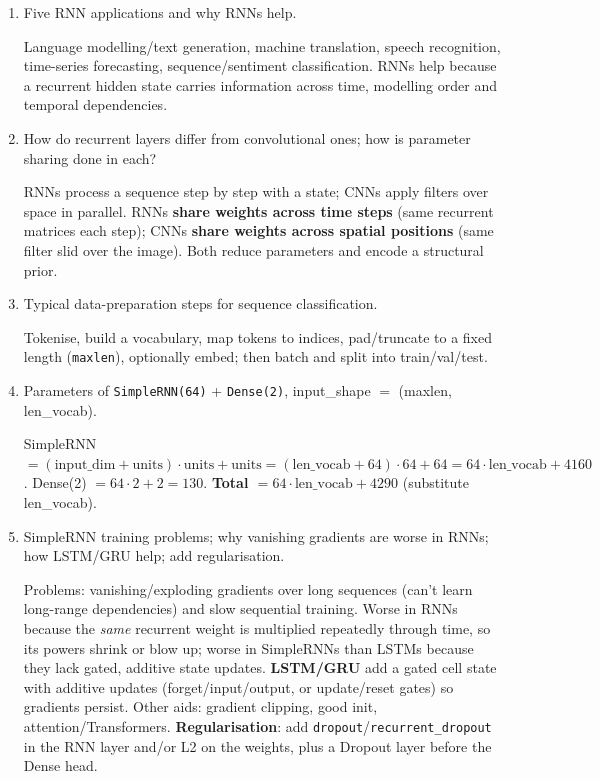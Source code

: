 \documentclass[10pt,a4paper]{article}
\newcommand{\q}[1]{\item #1}
\begin{document}
\begin{enumerate}[leftmargin=*,label=\textbf{Q\arabic*.}]

\q Five RNN applications and why RNNs help.
\begin{answerbox}
Language modelling/text generation, machine translation, speech recognition, time-series forecasting, sequence/sentiment classification. RNNs help because a recurrent hidden state carries information across time, modelling order and temporal dependencies.
\end{answerbox}

\q How do recurrent layers differ from convolutional ones; how is parameter sharing done in each?
\begin{answerbox}
RNNs process a sequence step by step with a state; CNNs apply filters over space in parallel. RNNs \textbf{share weights across time steps} (same recurrent matrices each step); CNNs \textbf{share weights across spatial positions} (same filter slid over the image). Both reduce parameters and encode a structural prior.
\end{answerbox}

\q Typical data-preparation steps for sequence classification.
\begin{answerbox}
Tokenise, build a vocabulary, map tokens to indices, pad/truncate to a fixed length (\texttt{maxlen}), optionally embed; then batch and split into train/val/test.
\end{answerbox}

\q Parameters of \texttt{SimpleRNN(64)} + \texttt{Dense(2)}, input\_shape $=$ (maxlen, len\_vocab).
\begin{answerbox}
SimpleRNN $=(\text{input\_dim}+\text{units})\cdot\text{units}+\text{units} = (\text{len\_vocab}+64)\cdot64 + 64 = 64\cdot\text{len\_vocab}+4160$. Dense(2) $=64\cdot2+2=130$. \textbf{Total $=64\cdot\text{len\_vocab}+4290$} (substitute len\_vocab).
\end{answerbox}

\q SimpleRNN training problems; why vanishing gradients are worse in RNNs; how LSTM/GRU help; add regularisation.
\begin{answerbox}
Problems: vanishing/exploding gradients over long sequences (can't learn long-range dependencies) and slow sequential training. Worse in RNNs because the \emph{same} recurrent weight is multiplied repeatedly through time, so its powers shrink or blow up; worse in SimpleRNNs than LSTMs because they lack gated, additive state updates. \textbf{LSTM/GRU} add a gated cell state with additive updates (forget/input/output, or update/reset gates) so gradients persist. Other aids: gradient clipping, good init, attention/Transformers. \textbf{Regularisation}: add \texttt{dropout}/\texttt{recurrent\_dropout} in the RNN layer and/or L2 on the weights, plus a Dropout layer before the Dense head.
\end{answerbox}


\end{enumerate}
\end{document}
